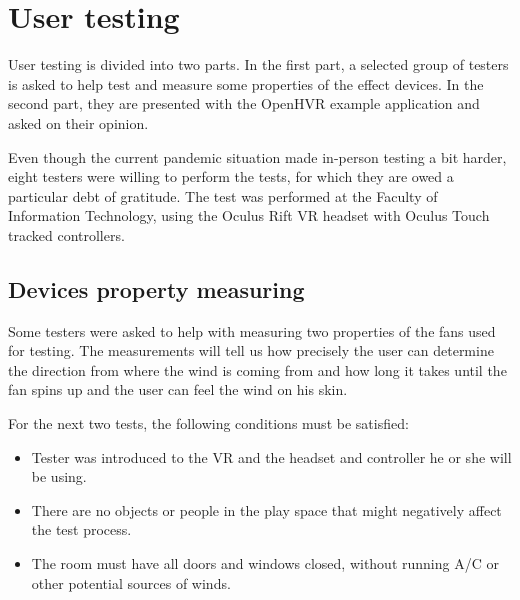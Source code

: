 \chapter{User testing}

User testing is divided into two parts. In the first part,
a selected group of testers is asked to help test and measure some properties
of the effect devices. In the second part, they are presented with the OpenHVR 
example application and asked on their opinion.


Even though the current pandemic situation made in-person testing a bit harder,
eight testers were willing to perform the tests, for which they are owed
a particular debt of gratitude.
The test was performed at the Faculty of Information Technology, using
the Oculus Rift VR headset with Oculus Touch tracked controllers.


\hypertarget{x-devices-property-measuring}{\section{Devices property measuring}}
Some testers were asked to help with measuring two properties of the fans used
for testing. The measurements will tell us how precisely the user can determine the
direction from where the wind is coming from and how long it takes until the
fan spins up and the user can feel the wind on his skin.


For the next two tests, the following conditions must be satisfied:


\begin{itemize}
    \itemsep0em

\item Tester was introduced to the VR and the headset and controller
he or she will be using.

\item There are no objects or people in the play space that might negatively affect
the test process.

\item The room must have all doors and windows closed, without running A/C
or other potential sources of winds.

\end{itemize}


